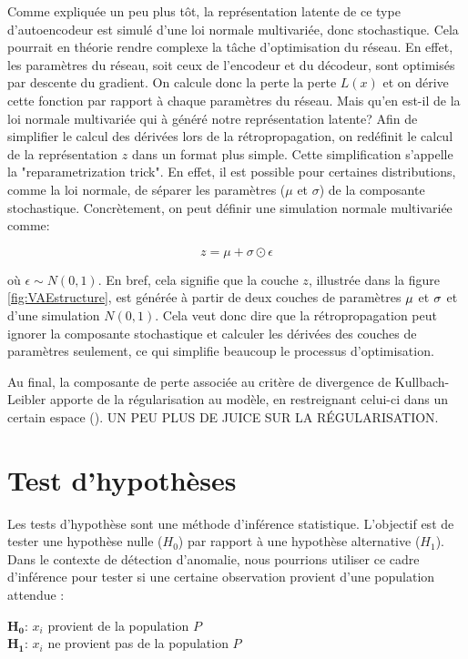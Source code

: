 Comme expliquée un peu plus tôt, la représentation latente de ce type d'autoencodeur est simulé d'une loi normale multivariée, donc stochastique. Cela pourrait en théorie rendre complexe la tâche d'optimisation du réseau. En effet, les paramètres du réseau, soit ceux de l'encodeur et du décodeur, sont optimisés par descente du gradient. On calcule donc la perte la perte $L(x)$ et on dérive cette fonction par rapport à chaque paramètres du réseau. Mais qu'en est-il de la loi normale multivariée qui à généré notre représentation latente? Afin de simplifier le calcul des dérivées lors de la rétropropagation, on redéfinit le calcul de la représentation $z$ dans un format plus simple. Cette simplification s'appelle la "reparametrization trick". En effet, il est possible pour certaines distributions, comme la loi normale, de séparer les paramètres ($\mu$ et $\sigma$)  de la composante stochastique. Concrètement, on peut définir une simulation normale multivariée comme:

$$
z = \mu + \sigma \odot \epsilon
$$

\noindent où $\epsilon \sim N(0,1)$. En bref, cela signifie que la couche $z$, illustrée dans la figure \ref{fig:VAEstructure}, est générée à partir de deux couches de paramètres $\boldmath \mu$ et $\boldmath \sigma$ et d'une simulation $N(0,1)$. Cela veut donc dire que la rétropropagation peut ignorer la composante stochastique et calculer les dérivées des couches de paramètres seulement, ce qui simplifie beaucoup le processus d'optimisation.

Au final, la composante de perte associée au critère de divergence de Kullbach-Leibler apporte de la régularisation au modèle, en restreignant celui-ci dans un certain espace (\cite{kingma2013autoencoding}). UN PEU PLUS DE JUICE SUR LA RÉGULARISATION.


\section{Test d'hypothèses}

Les tests d'hypothèse sont une méthode d'inférence statistique. L'objectif est de tester une hypothèse nulle ($H_0$) par rapport à une hypothèse alternative ($H_1$). Dans le contexte de détection d'anomalie, nous pourrions utiliser ce cadre d'inférence pour tester si une certaine observation provient d'une population attendue : \newline

\noindent $\boldsymbol{H_0}$: $x_i$ provient de la population $P$ \\
$\boldsymbol{H_1}$: $x_i$ ne provient pas de la population $P$
\newline

